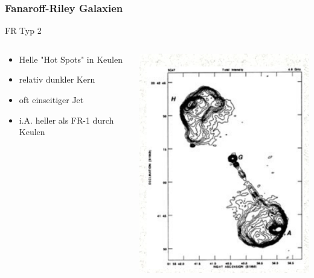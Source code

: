 \documentclass[aspectratio=1610, 9pt]{beamer}
\begin{document}
\begin{frame}\frametitle{Fanaroff-Riley Galaxien}
  \begin{block}{FR Typ 2}
  \begin{columns}
  \begin{column}[c]{0.45\linewidth}
    \begin{itemize}
      \item Helle "Hot Spots" in Keulen
      \item relativ dunkler Kern
      \item oft einseitiger Jet
      \item i.A. heller als FR-1 durch Keulen
    \end{itemize}
  \end{column}
  \begin{column}[c]{0.45\linewidth}
    \includegraphics{images/FR2.png}
  \end{column}
  \end{columns}
  \end{block}
\end{frame}
\end{document}
